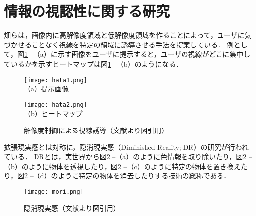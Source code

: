 \section{情報の視認性に関する研究}
  畑らは，画像内に高解像度領域と低解像度領域を作ることによって，ユーザに気づかせることなく視線を特定の領域に誘導させる手法を提案している\cite{Hata:2016}．
  例として，図\ref{figure:hata} --（a）に示す画像をユーザに提示すると，ユーザの視線がどこに集中しているかを示すヒートマップは図\ref{figure:hata} --（b）のようになる．
  \begin{figure}[tb]
    \begin{minipage}{0.49\hsize}
      \begin{center}
        \texttt{[image: hata1.png]}\\
        \small{（a）提示画像}
      \end{center}
    \end{minipage}
    \begin{minipage}{0.49\hsize}
      \begin{center}
        \texttt{[image: hata2.png]}\\
        \small{（b）ヒートマップ}
      \end{center}
    \end{minipage}
    \vspace{2pt}
    \caption{解像度制御による視線誘導（文献\cite{Hata:2016}より図引用）}
    \label{figure:hata}
  \end{figure}

  拡張現実感とは対称に，隠消現実感（Diminished Reality; DR）の研究が行われている\cite{Mori:2017}．
  DRとは，実世界から図\ref{figure:mori} --（a）のように色情報を取り除いたり，図\ref{figure:mori} --（b）のように物体を透視したり，図\ref{figure:mori} --（c）のように特定の物体を置き換えたり，図\ref{figure:mori} --（d）のように特定の物体を消去したりする技術の総称である．
  \begin{figure}[tb]
    \centerline{\texttt{[image: mori.png]}}
    \caption{隠消現実感（文献\cite{Mori:2017}より図引用）}
    \label{figure:mori}
  \end{figure}

